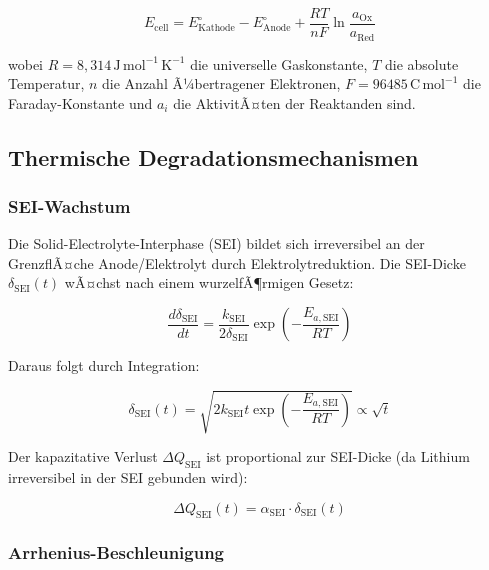 ﻿\documentclass[12pt,a4paper]{article}
\begin{document}
	\begin{equation}
		E_\mathrm{cell} = E^\circ_\mathrm{Kathode} - E^\circ_\mathrm{Anode}
		+ \frac{RT}{nF}\ln\frac{a_\mathrm{Ox}}{a_\mathrm{Red}}
		\label{eq:nernst}
	\end{equation}
	
	wobei $R = 8{,}314\,\mathrm{J\,mol^{-1}\,K^{-1}}$ die universelle Gaskonstante,
	$T$ die absolute Temperatur, $n$ die Anzahl Ã¼bertragener Elektronen, $F =
	96485\,\mathrm{C\,mol^{-1}}$ die Faraday-Konstante und $a_i$ die AktivitÃ¤ten
	der Reaktanden sind.
	
	\subsection{Thermische Degradationsmechanismen}
	\label{subsec:therm_deg}
	
	\subsubsection{SEI-Wachstum}
	
	Die Solid-Electrolyte-Interphase (SEI) bildet sich irreversibel an der
	GrenzflÃ¤che Anode/Elektrolyt durch Elektrolytreduktion. Die SEI-Dicke
	$\delta_\mathrm{SEI}(t)$ wÃ¤chst nach einem wurzelfÃ¶rmigen Gesetz:
	
	\begin{equation}
		\frac{d\delta_\mathrm{SEI}}{dt} = \frac{k_\mathrm{SEI}}{2\delta_\mathrm{SEI}}
		\exp\!\left(-\frac{E_{a,\mathrm{SEI}}}{RT}\right)
		\label{eq:sei_growth}
	\end{equation}
	
	Daraus folgt durch Integration:
	
	\begin{equation}
		\delta_\mathrm{SEI}(t) = \sqrt{2 k_\mathrm{SEI} t \exp\!\left(-\frac{E_{a,\mathrm{SEI}}}{RT}\right)}
		\propto \sqrt{t}
		\label{eq:sei_sqrt}
	\end{equation}
	
	Der kapazitative Verlust $\Delta Q_\mathrm{SEI}$ ist proportional zur SEI-Dicke
	(da Lithium irreversibel in der SEI gebunden wird):
	
	\begin{equation}
		\Delta Q_\mathrm{SEI}(t) = \alpha_\mathrm{SEI} \cdot \delta_\mathrm{SEI}(t)
		\label{eq:cap_loss_sei}
	\end{equation}
	
	\subsubsection{Arrhenius-Beschleunigung}
	
\end{document}
